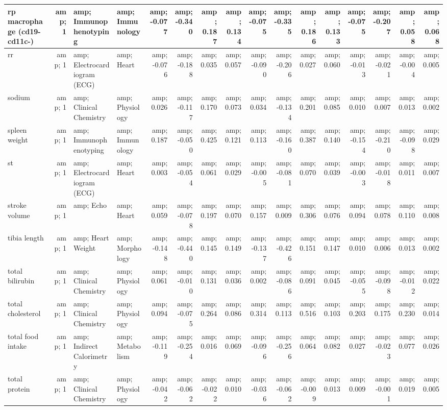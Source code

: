 \documentclass[]{article}
\begin{document}
\begin{table}
\begin{tabular}[t]{l|r|l|l|r|r|r|r|r|r|r|r|r|r|r|r}
\hline
rp macrophage (cd19-  cd11c-) &amp; 1 &amp; Immunophenotyping &amp; Immunology &amp; -0.077 &amp; -0.340 &amp; 0.187 &amp; 0.134 &amp; -0.075 &amp; -0.335 &amp; 0.186 &amp; 0.133 &amp; -0.075 &amp; -0.207 &amp; 0.058 &amp; 0.068\\
\hline
rr &amp; 1 &amp; Electrocardiogram (ECG) &amp; Heart &amp; -0.076 &amp; -0.188 &amp; 0.035 &amp; 0.057 &amp; -0.090 &amp; -0.206 &amp; 0.027 &amp; 0.060 &amp; -0.013 &amp; -0.021 &amp; -0.004 &amp; 0.005\\
\hline
sodium &amp; 1 &amp; Clinical Chemistry &amp; Physiology &amp; 0.026 &amp; -0.117 &amp; 0.170 &amp; 0.073 &amp; 0.034 &amp; -0.134 &amp; 0.201 &amp; 0.085 &amp; 0.010 &amp; 0.007 &amp; 0.013 &amp; 0.002\\
\hline
spleen weight &amp; 1 &amp; Immunophenotyping &amp; Immunology &amp; 0.187 &amp; -0.050 &amp; 0.425 &amp; 0.121 &amp; 0.113 &amp; -0.160 &amp; 0.387 &amp; 0.140 &amp; -0.154 &amp; -0.210 &amp; -0.098 &amp; 0.029\\
\hline
st &amp; 1 &amp; Electrocardiogram (ECG) &amp; Heart &amp; 0.003 &amp; -0.054 &amp; 0.061 &amp; 0.029 &amp; -0.005 &amp; -0.081 &amp; 0.070 &amp; 0.039 &amp; -0.003 &amp; -0.018 &amp; 0.011 &amp; 0.007\\
\hline
stroke volume &amp; 1 &amp; Echo &amp; Heart &amp; 0.059 &amp; -0.078 &amp; 0.197 &amp; 0.070 &amp; 0.157 &amp; 0.009 &amp; 0.306 &amp; 0.076 &amp; 0.094 &amp; 0.078 &amp; 0.110 &amp; 0.008\\
\hline
tibia length &amp; 1 &amp; Heart Weight &amp; Morphology &amp; -0.148 &amp; -0.440 &amp; 0.145 &amp; 0.149 &amp; -0.137 &amp; -0.426 &amp; 0.151 &amp; 0.147 &amp; 0.010 &amp; 0.006 &amp; 0.013 &amp; 0.002\\
\hline
total bilirubin &amp; 1 &amp; Clinical Chemistry &amp; Physiology &amp; 0.061 &amp; -0.010 &amp; 0.131 &amp; 0.036 &amp; 0.002 &amp; -0.086 &amp; 0.091 &amp; 0.045 &amp; -0.055 &amp; -0.098 &amp; -0.012 &amp; 0.022\\
\hline
total cholesterol &amp; 1 &amp; Clinical Chemistry &amp; Physiology &amp; 0.094 &amp; -0.075 &amp; 0.264 &amp; 0.086 &amp; 0.314 &amp; 0.113 &amp; 0.516 &amp; 0.103 &amp; 0.203 &amp; 0.175 &amp; 0.230 &amp; 0.014\\
\hline
total food intake &amp; 1 &amp; Indirect Calorimetry &amp; Metabolism &amp; -0.119 &amp; -0.254 &amp; 0.016 &amp; 0.069 &amp; -0.096 &amp; -0.256 &amp; 0.064 &amp; 0.082 &amp; 0.027 &amp; -0.023 &amp; 0.077 &amp; 0.026\\
\hline
total protein &amp; 1 &amp; Clinical Chemistry &amp; Physiology &amp; -0.042 &amp; -0.062 &amp; -0.022 &amp; 0.010 &amp; -0.036 &amp; -0.062 &amp; -0.009 &amp; 0.013 &amp; 0.009 &amp; -0.001 &amp; 0.019 &amp; 0.005\\

\end{tabular}
\end{table}
\end{document}
